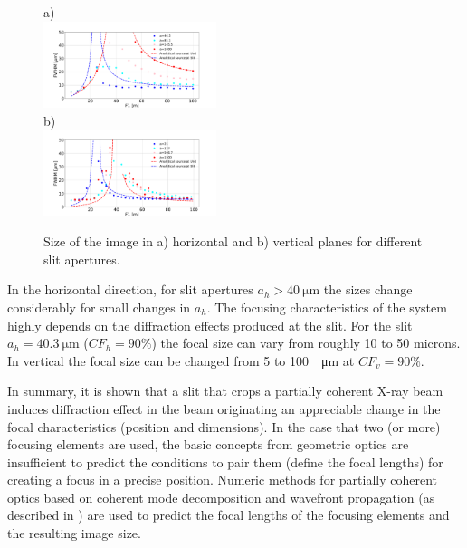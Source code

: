 \documentclass[doublecol]{epl2}
\begin{document}
\begin{figure}[H]
a)\\
\hspace{-3cm}
    \includegraphics[width=0.45\textwidth]{sizes_h-eps-converted-to.pdf}\\
b)\\
\hspace{-2.0cm}
    \includegraphics[width=0.45\textwidth]{sizes_v-eps-converted-to.pdf}

    \caption{
    \label{fig:focalSizes}
    Size of the image in a) horizontal and b) vertical planes for different slit apertures.
    }
\end{figure}
In the horizontal direction, for slit apertures $a_h>\SI{40}{\micro\meter}$ the sizes change considerably for small changes in $a_h$. The focusing characteristics of the system highly depends on the diffraction effects produced at the slit. For the slit $a_h=\SI{40.3}{\micro\meter}$ ($CF_h=90\%$) the focal size can vary from roughly 10 to 50 microns. In vertical the focal size can be changed from 5 to 100~\SI{}{\micro\meter} at $CF_v=90\%$.

In summary, it is shown that a slit that crops a partially coherent X-ray beam induces diffraction effect in the beam originating an appreciable change in the focal characteristics (position and dimensions). In the case that two (or more) focusing elements are used, the basic concepts from geometric optics are insufficient to predict the conditions to pair them (define the focal lengths) for creating a focus in a precise position. Numeric methods for partially coherent optics based on coherent mode decomposition and wavefront propagation (as described in \cite{multioptics}) are used to predict the focal lengths of the focusing elements and the resulting image size.   
\end{document}
